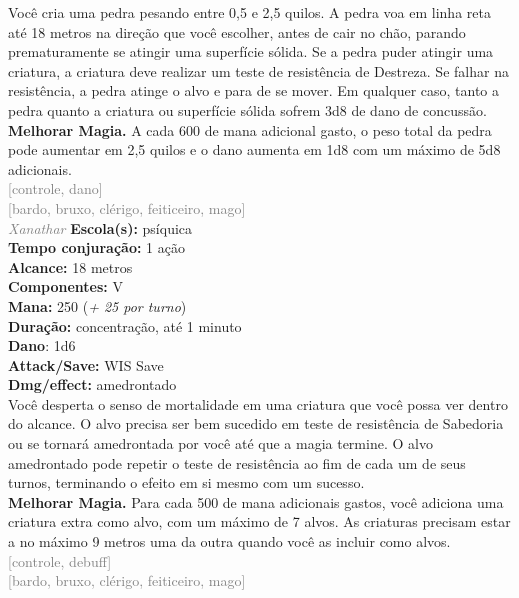 \documentclass{RPG_Adventure}[2021/10/20]
\begin{document}
{\normalsize Você cria uma pedra pesando entre 0,5 e 2,5 quilos. A pedra voa em linha reta até 18 metros na direção que você escolher, antes de cair no chão, parando prematuramente se atingir uma superfície sólida. Se a pedra puder atingir uma criatura, a criatura deve realizar um teste de resistência de Destreza. Se falhar na resistência, a pedra atinge o alvo e para de se mover. Em qualquer caso, tanto a pedra quanto a criatura ou superfície sólida sofrem 3d8 de dano de concussão.\\\t \textbf{Melhorar Magia.} A cada 600 de mana adicional gasto, o peso total da pedra pode aumentar em 2,5 quilos e o dano aumenta em 1d8 com um máximo de 5d8 adicionais.\\}
{\scriptsize \textcolor{gray}{[controle, dano]\\}}
{\scriptsize \textcolor{gray}{[bardo, bruxo, clérigo, feiticeiro, mago]\\}}
{\tiny \textcolor{gray}{\textit{Xanathar}}}
{\small \t \textbf{Escola(s):} psíquica\\\t \textbf{Tempo conjuração:} 1 ação\\\t \textbf{Alcance:} 18 metros\\\t \textbf{Componentes:} V\\\t \textbf{Mana:} 250 (\textit{+ 25 por turno})\\\t \textbf{Duração:} concentração, até 1 minuto\\\t \textbf{Dano}: 1d6\\\t \textbf{Attack/Save:} WIS Save\\\t \textbf{Dmg/effect:} amedrontado\\}
{\normalsize Você desperta o senso de mortalidade em uma criatura que você possa ver dentro do alcance. O alvo precisa ser bem sucedido em teste de resistência de Sabedoria ou se tornará amedrontada por você até que a magia termine. O alvo amedrontado pode repetir o teste de resistência ao fim de cada um de seus turnos, terminando o efeito em si mesmo com um sucesso.\\\t \textbf{Melhorar Magia.} Para cada 500 de mana adicionais gastos, você adiciona uma criatura extra como alvo, com um máximo de 7 alvos. As criaturas precisam estar a no máximo 9 metros uma da outra quando você as incluir como alvos.\\}
{\scriptsize \textcolor{gray}{[controle, debuff]\\}}
{\scriptsize \textcolor{gray}{[bardo, bruxo, clérigo, feiticeiro, mago]\\}}
\end{document}
